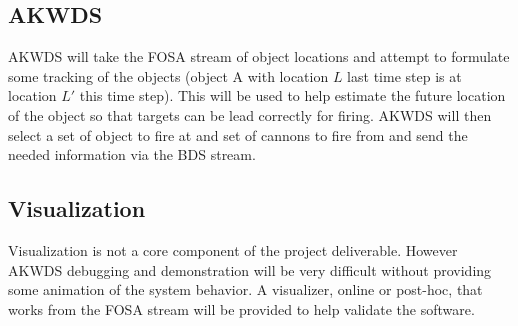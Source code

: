 \subsection*{AKWDS}
AKWDS will take the FOSA stream of object locations and attempt to formulate some tracking of the objects (object A with location $L$ last time step is at location $L'$ this time step). This will be used to help estimate the future location of the object so that targets can be lead correctly for firing. AKWDS will then select a set of object to fire at and set of cannons to fire from and send the needed information via the BDS stream.

\subsection*{Visualization}
Visualization is not a core component of the project deliverable. However AKWDS debugging and demonstration will be very difficult without providing some animation of the system behavior. A visualizer, online or post-hoc, that works from the FOSA stream will be provided to help validate the software.